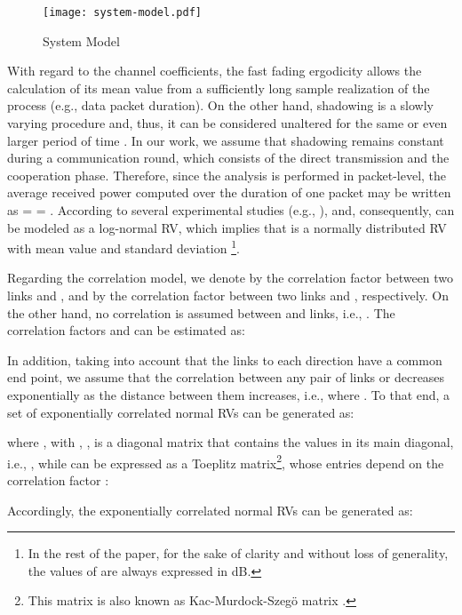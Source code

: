 \documentclass[12pt,draftcls, onecolumn]{IEEEtran}
\begin{document}
\begin{figure}[htb]
\centering
\texttt{[image: system-model.pdf]}
\caption{System Model}\label{f1}
\end{figure}

With regard to the channel coefficients, the fast fading ergodicity allows the calculation of its mean value from a sufficiently long sample realization of the process (e.g., data packet duration). On the other hand, shadowing is a slowly varying procedure and, thus, it can be considered unaltered for the same or even larger period of time \cite{thesismary}. In our work, we assume that shadowing remains constant during a communication round, which consists of the direct transmission and the cooperation phase. Therefore, since the analysis is performed in packet-level, the average received power computed over the duration of one packet may be written as = = . According to several experimental studies (e.g., \cite{5288484}),  and, consequently,  can be modeled as a log-normal RV, which implies that  is a normally distributed RV with mean value  and standard deviation \footnote{In the rest of the paper, for the sake of clarity and without loss of generality, the values of  are always expressed in dB.}.

Regarding the correlation model, we denote by  the correlation factor between two links  and , and by  the correlation factor between two links  and , respectively. On the other hand, no correlation is assumed between  and  links, i.e., . The correlation factors  and  can be estimated as:




In addition, taking into account that the links to each direction have a common end point, we assume that the correlation between any pair of links  or   decreases exponentially as the distance between them increases, i.e.,  where \cite{104090}. To that end, a set of exponentially correlated normal RVs  can be generated as:

\begingroup

\endgroup

\noindent where , with , ,  is a diagonal matrix that contains the  values in its main diagonal, i.e., , while  can be expressed as a Toeplitz matrix\footnote{This matrix is also known as Kac-Murdock-Szeg\"{o} matrix \cite{toeplitz}.}, whose entries depend on the correlation factor :

\begingroup

\endgroup

\noindent Accordingly, the exponentially correlated normal RVs  can be generated as:
\end{document}
